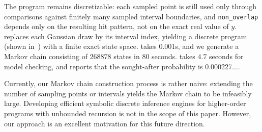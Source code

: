 The program remains discretizable: each sampled point is still used only through comparisons against finitely many sampled interval boundaries, and \lstinline{non_overlap} depends only on the resulting hit pattern, not on the exact real value of $y$. \Slice{} replaces each Gaussian draw by its interval index, yielding a discrete program (shown in~\cite[Figure~22]{Wu2026SliceExtended}) with a finite exact state space. \Slice{} takes 0.001s, and we generate a Markov chain consisting of $268878$ states in $80$ seconds. \Storm takes $4.7$ seconds for model checking, and reports that the sought-after probability is 0.000227....

Currently, our Markov chain construction process is rather naive: extending the number of sampling points or intervals yields the Markov chain to be infeasibly large. Developing efficient symbolic discrete inference engines for higher-order programs with unbounded recursion is not in the scope of this paper. However, our approach is an excellent motivation for this future direction. 

